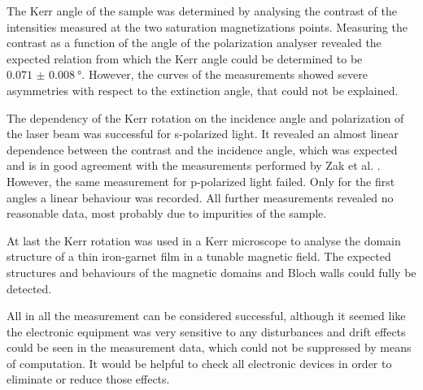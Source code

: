 \documentclass[a4paper]{scrartcl}
\numberwithin{equation}{section}
\numberwithin{figure}{section}
\numberwithin{table}{section}
\begin{document}
The Kerr angle of the sample was determined by analysing the contrast of the intensities measured at the two saturation magnetizations points. Measuring the contrast as a function of the angle of the polarization analyser revealed the expected relation from which the Kerr angle could be determined to be $\SI{0.071(8)}{\degree}$. However, the curves of the measurements showed severe asymmetries with respect to the extinction angle, that could not be explained.

The dependency of the Kerr rotation on the incidence angle and polarization of the laser beam was successful for s-polarized light. It revealed an almost linear dependence between the contrast and the incidence angle, which was expected and is in good agreement with the measurements performed by  Zak et al. \cite{paper}. However, the same measurement for p-polarized light failed. Only for the first angles a linear behaviour was recorded. All further measurements revealed no reasonable data, most probably due to impurities of the sample.

At last the Kerr rotation was used in a Kerr microscope to analyse the domain structure of a thin iron-garnet film in a tunable magnetic field. The expected structures and behaviours of the magnetic domains and Bloch walls could fully be detected.

All in all the measurement can be considered successful, although it seemed like the electronic equipment was very sensitive to any disturbances and drift effects could be seen in the measurement data, which could not be suppressed by means of computation. It would be helpful to check all electronic devices in order to eliminate or reduce those effects. 
 

\end{document}
